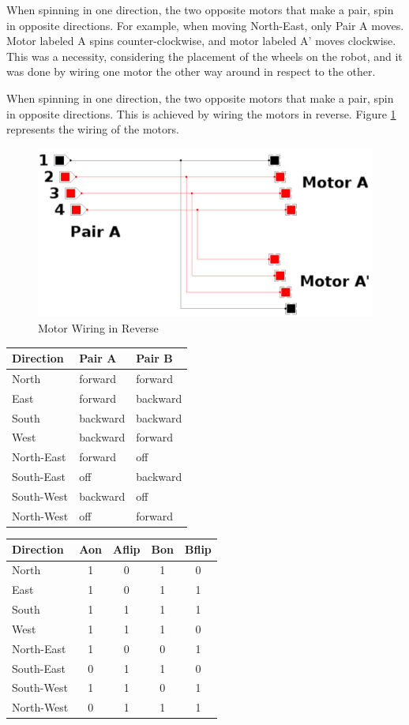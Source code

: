 When spinning in one direction, the two opposite motors that make a pair, spin in opposite 
directions. For example, when moving North-East, only Pair A moves. Motor labeled A spins 
counter-clockwise, and motor labeled A’ moves clockwise. This was a necessity, considering the 
placement of the wheels on the robot, and it was done by wiring one motor the other way around in 
respect to the other.

When spinning in one direction, the two opposite motors that make a pair, spin in opposite 
directions. This is achieved by wiring the motors in reverse. Figure \ref{fig:reverse_wiring}
represents the wiring of the motors.
\begin{figure}[htp]
	\centering
	\includegraphics[width=\textwidth]{figures/move/motor_pairs_cedar.png}
	\caption{Motor Wiring in Reverse}
	\label{fig:reverse_wiring}
\end{figure}
\begin{center}
	\begin{tabular}{|l|l|l|}
		\hline
		Direction & Pair A & Pair B	\\
		\hline
		North & forward & forward \\
		East 	& forward & backward \\
		South & backward & backward \\
		West 	& backward & forward \\
		\hline
		North-East & forward & off \\
		South-East & off & backward \\
		South-West & backward & off\\
		North-West & off & forward \\
		\hline
	\end{tabular}
	\begin{tabular}{|l|c|c|c|c|}
		\hline
		Direction & Aon & Aflip & Bon & Bflip \\
		\hline
		North & 1 & 0 & 1 & 0 \\
		East 	& 1 & 0 & 1 & 1 \\
		South & 1 & 1 & 1 & 1 \\
		West 	& 1 & 1 & 1 & 0 \\
		\hline
		North-East & 1 & 0 & 0 & 1 \\
		South-East & 0 & 1 & 1 & 0 \\
		South-West & 1 & 1 & 0 & 1 \\
		North-West & 0 & 1 & 1 & 1 \\
		\hline
	\end{tabular}
	\label{table:directions}
\end{center}